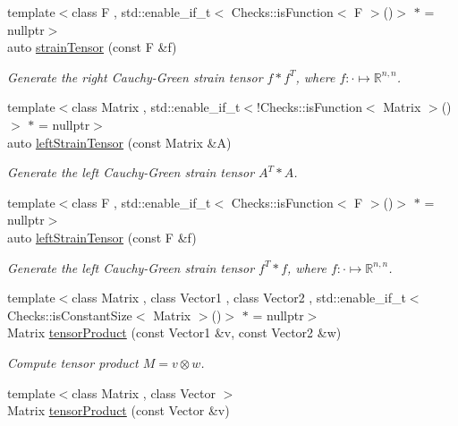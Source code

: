 \begin{DoxyCompactItemize}
{\footnotesize template$<$class F , std\-::enable\-\_\-if\-\_\-t$<$ Checks\-::is\-Function$<$ F $>$()$>$ $\ast$  = nullptr$>$ }\\auto \hyperlink{namespaceFunG_1_1LinearAlgebra_ab4371788da401ca62a3a29a13cf8d4ce}{strain\-Tensor} (const F \&f)
\begin{DoxyCompactList}\small\item\em Generate the right Cauchy-\/\-Green strain tensor $f*f^T$, where $f:\cdot\mapsto\mathbb{R}^{n,n} $. \end{DoxyCompactList}\item 
{\footnotesize template$<$class Matrix , std\-::enable\-\_\-if\-\_\-t$<$!\-Checks\-::is\-Function$<$ Matrix $>$()$>$ $\ast$  = nullptr$>$ }\\auto \hyperlink{namespaceFunG_1_1LinearAlgebra_a5876e082c6e15e8e9a985a855dc698d5}{left\-Strain\-Tensor} (const Matrix \&A)
\begin{DoxyCompactList}\small\item\em Generate the left Cauchy-\/\-Green strain tensor $A^T*A$. \end{DoxyCompactList}\item 
{\footnotesize template$<$class F , std\-::enable\-\_\-if\-\_\-t$<$ Checks\-::is\-Function$<$ F $>$()$>$ $\ast$  = nullptr$>$ }\\auto \hyperlink{namespaceFunG_1_1LinearAlgebra_a4ed7509f976a86c83048609da5e8bac7}{left\-Strain\-Tensor} (const F \&f)
\begin{DoxyCompactList}\small\item\em Generate the left Cauchy-\/\-Green strain tensor $f^T*f$, where $f:\cdot\mapsto\mathbb{R}^{n,n} $. \end{DoxyCompactList}\item 
{\footnotesize template$<$class Matrix , class Vector1 , class Vector2 , std\-::enable\-\_\-if\-\_\-t$<$ Checks\-::is\-Constant\-Size$<$ Matrix $>$()$>$ $\ast$  = nullptr$>$ }\\Matrix \hyperlink{group__LinearAlgebraGroup_ga5d0e066e6184fb3324d96d20087b5578}{tensor\-Product} (const Vector1 \&v, const Vector2 \&w)
\begin{DoxyCompactList}\small\item\em Compute tensor product $ M = v \otimes w $. \end{DoxyCompactList}\item 
{\footnotesize template$<$class Matrix , class Vector $>$ }\\Matrix \hyperlink{group__LinearAlgebraGroup_gae5e82b9e66319511dae5ff0d9304a6b7}{tensor\-Product} (const Vector \&v)

\end{DoxyCompactItemize}
